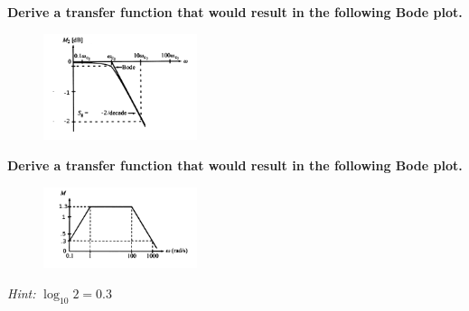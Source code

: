 

\begin{enumerate}

\qitem
  \textbf{Derive a transfer function that would result in the following Bode plot.}
  \begin{figure}[H]\centering
  \includegraphics[width=0.4\textwidth]{q_bode/bode1_fixed}
  \end{figure}


\qitem
  \textbf{Derive a transfer function that would result in the following Bode plot.}
  \begin{figure}[H]\centering
  \includegraphics[width=0.4\textwidth]{q_bode/bode2_fixed}
  \end{figure}
  \textit{Hint:} $\log_{10} 2 = 0.3$



\end{enumerate}
